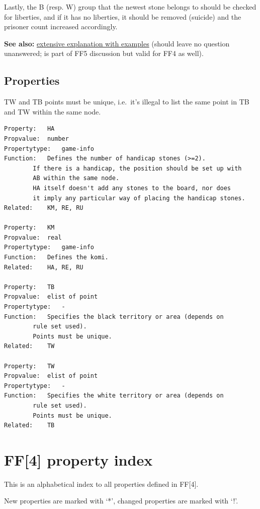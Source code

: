 Lastly, the B (resp. W) group that the newest stone belongs to should be
checked for liberties, and if it has no liberties, it should be removed
(suicide) and the prisoner count increased accordingly.

\textbf{See also:}
\href{https://red-bean.com/sgf/ff5/m_vs_ax.htm}{extensive explanation
with examples} (should leave no question unanswered; is part of FF5
discussion but valid for FF4 as well).

\subsection{Properties}\label{properties}

TW and TB points must be unique, i.e.~it's illegal to list the same
point in TB and TW within the same node.

\begin{verbatim}
Property:   HA
Propvalue:  number
Propertytype:   game-info
Function:   Defines the number of handicap stones (>=2).
        If there is a handicap, the position should be set up with
        AB within the same node.
        HA itself doesn't add any stones to the board, nor does
        it imply any particular way of placing the handicap stones.
Related:    KM, RE, RU

Property:   KM
Propvalue:  real
Propertytype:   game-info
Function:   Defines the komi.
Related:    HA, RE, RU

Property:   TB
Propvalue:  elist of point
Propertytype:   -
Function:   Specifies the black territory or area (depends on
        rule set used).
        Points must be unique.
Related:    TW

Property:   TW
Propvalue:  elist of point
Propertytype:   -
Function:   Specifies the white territory or area (depends on
        rule set used).
        Points must be unique.
Related:    TB
\end{verbatim}

\newpage

\section{FF{[}4{]} property index}\label{ff4-property-index}

This is an alphabetical index to all properties defined in FF{[}4{]}.

New properties are marked with `*', changed properties are marked with
`!'.

